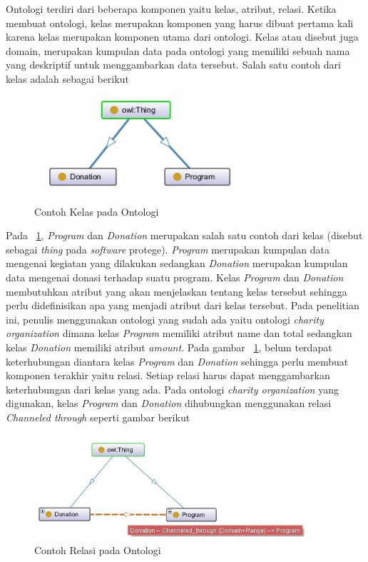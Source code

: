 Ontologi terdiri dari beberapa komponen yaitu kelas, atribut, relasi. Ketika membuat ontologi, kelas merupakan komponen yang harus dibuat pertama kali karena kelas merupakan komponen utama dari ontologi. Kelas atau disebut juga domain, merupakan kumpulan data pada ontologi yang memiliki sebuah nama yang deskriptif untuk menggambarkan data tersebut. Salah satu contoh dari kelas adalah sebagai berikut

\begin{figure}
	\centering
	\includegraphics[width=0.7\textwidth]
	{pics/domain.jpg}
	\caption{Contoh Kelas pada Ontologi}
	\label{fig:class}
\end{figure}
\vspace{-0.3cm}

Pada \pic~\ref{fig:class}, \textit{Program} dan \textit{Donation} merupakan salah satu contoh dari kelas (disebut sebagai \textit{thing} pada \textit{software} protege). \textit{Program} merupakan kumpulan data mengenai kegiatan yang dilakukan sedangkan \textit{Donation} merupakan kumpulan data mengenai donasi terhadap suatu program. Kelas \textit{Program} dan \textit{Donation} membutuhkan atribut yang akan menjelaskan tentang kelas tersebut sehingga perlu didefinisikan apa yang menjadi atribut dari kelas tersebut. Pada penelitian ini, penulis menggunakan ontologi yang sudah ada yaitu ontologi \textit{charity organization} dimana kelas \textit{Program} memiliki atribut name dan total sedangkan kelas \textit{Donation} memiliki atribut \textit{amount}. Pada gambar \pic~\ref{fig:class}, belum terdapat keterhubungan diantara kelas \textit{Program} dan \textit{Donation} sehingga perlu membuat komponen terakhir yaitu relasi. Setiap relasi harus dapat menggambarkan keterhubungan dari kelas yang ada. Pada ontologi \textit{charity organization} yang digunakan, kelas \textit{Program} dan \textit{Donation} dihubungkan menggunakan relasi \textit{Channeled through} seperti gambar berikut

\begin{figure}
	\centering
	\includegraphics[width=0.9\textwidth]
	{pics/relationClass.jpg}
	\caption{Contoh Relasi pada Ontologi}
	\label{fig:relationClass}
\end{figure}
\vspace{-0.3cm}

